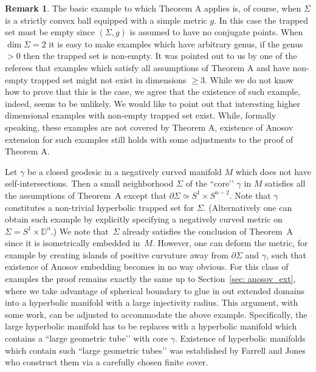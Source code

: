 \documentclass[JEP,XML,SOM,Unicode,NoFloatCountersInSection]{cedram}
\theoremstyle{definition}
\newtheorem*{remark*}{Remark}
\renewcommand{\>}{{\rangle}}
\newcommand{\<}{{\langle}}
\begin{document}
\begin{remark*}
The basic example to which Theorem A applies is, of course, when $\Sigma$ is a strictly convex ball equipped with a simple metric $g$. In this case the trapped set must be empty since $(\Sigma, g)$ is assumed to have no conjugate points. When $\dim \Sigma=2$ it is easy to make examples which have arbitrary genus, if the genus $>0$ then the trapped set is non-empty. It was pointed out to us by one of the referees that examples which satisfy all assumptions of Theorem A and have non-empty trapped set might not exist in dimensions $\ge 3$. While we do not know how to prove that this is the case, we agree that the existence of such example, indeed, seems to be unlikely. We would like to point out that interesting higher dimensional examples with non-empty trapped set exist. While, formally speaking, these examples are not covered by Theorem A, existence of Anosov extension for such examples still holds with some adjustments to the proof of Theorem A.

Let $\gamma$ be a closed geodesic in a negatively curved manifold $M$ which does not have self-intersections. Then a small neighborhood $\Sigma$ of the ``core’’ $\gamma$ in $M$ satisfies all the assumptions of Theorem~A except that $\partial\Sigma\simeq S^1\times S^{n-2}$. Note that $\gamma$ constitutes a non-trivial hyperbolic trapped set for $\Sigma$. (Alternatively one can obtain such example by explicitly specifying a negatively curved metric on $\Sigma=S^1\times\mathbb D^n$.) We note that~$\Sigma$ already satisfies the conclusion of Theorem~A since it is isometrically embedded in~$M$. However, one can deform the metric, for example by creating islands of positive curvature away from $\partial\Sigma$ and $\gamma$, such that existence of Anosov embedding becomes in no way obvious. For this class of examples the proof remains exactly the same up to Section~\ref{sec: anosov_ext}, where we take advantage of spherical boundary to glue in out extended domains into a hyperbolic manifold with a large injectivity radius. This argument, with some work, can be adjusted to accommodate the above example. Specifically, the large hyperbolic manifold has to be replaces with a hyperbolic manifold which contains a ``large geometric tube’’ with core $\gamma$. Existence of hyperbolic manifolds which contain such ``large geometric tubes’’ was established by Farrell and Jones~\cite[Cor.\,3.3]{FJ93} who construct them via a carefully chosen finite cover.
\end{remark*}
\end{document}
